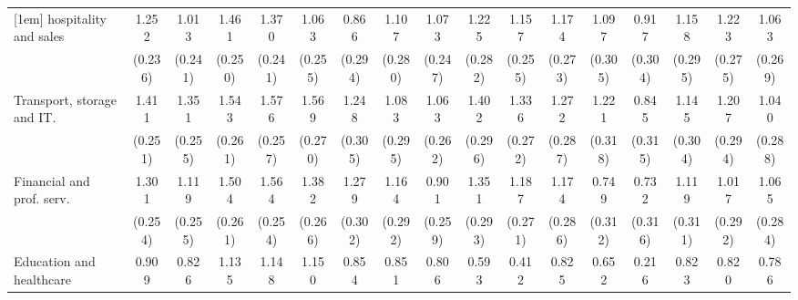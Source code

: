 {\begin{tabular}{l*{16}{c}}
[1em]
hospitality and sales&       1.252\sym{***}&       1.013\sym{***}&       1.461\sym{***}&       1.370\sym{***}&       1.063\sym{***}&       0.866\sym{**} &       1.107\sym{***}&       1.073\sym{***}&       1.225\sym{***}&       1.157\sym{***}&       1.174\sym{***}&       1.097\sym{***}&       0.917\sym{**} &       1.158\sym{***}&       1.223\sym{***}&       1.063\sym{***}\\
                    &     (0.236)         &     (0.241)         &     (0.250)         &     (0.241)         &     (0.255)         &     (0.294)         &     (0.280)         &     (0.247)         &     (0.282)         &     (0.255)         &     (0.273)         &     (0.305)         &     (0.304)         &     (0.295)         &     (0.275)         &     (0.269)         \\
[1em]
Transport, storage and IT.&       1.411\sym{***}&       1.351\sym{***}&       1.543\sym{***}&       1.576\sym{***}&       1.569\sym{***}&       1.248\sym{***}&       1.083\sym{***}&       1.063\sym{***}&       1.402\sym{***}&       1.336\sym{***}&       1.272\sym{***}&       1.221\sym{***}&       0.845\sym{**} &       1.145\sym{***}&       1.207\sym{***}&       1.040\sym{***}\\
                    &     (0.251)         &     (0.255)         &     (0.261)         &     (0.257)         &     (0.270)         &     (0.305)         &     (0.295)         &     (0.262)         &     (0.296)         &     (0.272)         &     (0.287)         &     (0.318)         &     (0.315)         &     (0.304)         &     (0.294)         &     (0.288)         \\
[1em]
Financial and prof. serv.&       1.301\sym{***}&       1.119\sym{***}&       1.504\sym{***}&       1.564\sym{***}&       1.382\sym{***}&       1.279\sym{***}&       1.164\sym{***}&       0.901\sym{***}&       1.351\sym{***}&       1.187\sym{***}&       1.174\sym{***}&       0.749\sym{*}  &       0.732\sym{*}  &       1.119\sym{***}&       1.017\sym{***}&       1.065\sym{***}\\
                    &     (0.254)         &     (0.255)         &     (0.261)         &     (0.254)         &     (0.266)         &     (0.302)         &     (0.292)         &     (0.259)         &     (0.293)         &     (0.271)         &     (0.286)         &     (0.312)         &     (0.316)         &     (0.311)         &     (0.292)         &     (0.284)         \\
[1em]
Education and healthcare&       0.909\sym{***}&       0.826\sym{**} &       1.135\sym{***}&       1.148\sym{***}&       1.150\sym{***}&       0.854\sym{*}  &       0.851\sym{**} &       0.806\sym{**} &       0.593         &       0.412         &       0.825\sym{*}  &       0.652         &       0.216         &       0.823\sym{*}  &       0.820\sym{*}  &       0.786\sym{*}  \\

\end{tabular}}
